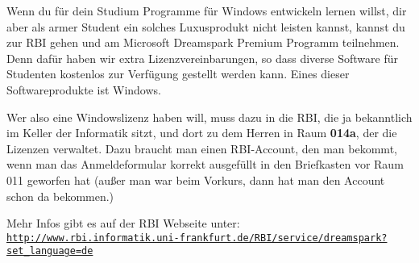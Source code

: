 \spaltenanfang
Wenn du f\"ur dein Studium Programme f\"ur Windows entwickeln lernen willst,
dir aber als armer Student ein solches Luxusprodukt nicht leisten kannst,
kannst du zur RBI gehen und am Microsoft Dreamspark Premium Programm
teilnehmen. Denn daf\"ur haben wir extra Lizenzvereinbarungen, so dass diverse
Software f\"ur Studenten kostenlos zur Verf\"ugung gestellt werden kann.
Eines dieser Softwareprodukte ist Windows.

Wer also eine Windowslizenz haben will, muss dazu in die RBI, die ja bekanntlich im Keller der Informatik sitzt,
und dort zu dem Herren in Raum \textbf{014a}, der die Lizenzen verwaltet. Dazu
braucht man einen RBI-Account, den man bekommt, wenn man das Anmeldeformular
korrekt ausgef\"ullt in den Briefkasten vor Raum 011 geworfen hat (au{\ss}er
man war beim Vorkurs, dann hat man den Account schon da bekommen.)

Mehr Infos gibt es auf der RBI Webseite unter: \texttt{\url{http://www.rbi.informatik.uni-frankfurt.de/RBI/service/dreamspark?set_language=de}}


\spaltenende

